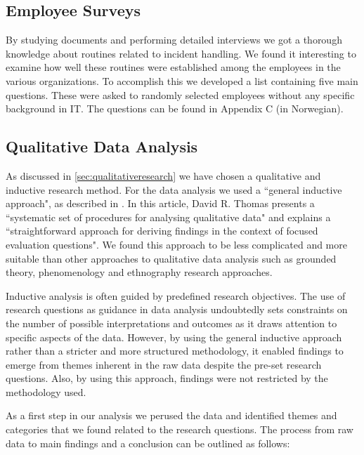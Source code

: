 \subsection{Employee Surveys}
\label{sec:employeeSurveys}
By studying documents and performing detailed interviews we got a thorough knowledge about routines related to incident handling. We found it interesting to examine how well these routines were established among the employees in the various organizations. To accomplish this we developed a list containing five main questions. These were asked to randomly selected employees without any specific background in IT. The questions can be found in Appendix C (in Norwegian).
 

\subsection{Qualitative Data Analysis}
\label{sec:qualitativeAnalysis}
As discussed in \ref{sec:qualitativeresearch} we have chosen a qualitative and inductive research method. For the data analysis we used a ``general inductive approach", as described in \cite{thomas2006general}. In this article, David R. Thomas presents a ``systematic set of procedures for analysing qualitative data" and explains a ``straightforward approach for deriving findings in the context of focused evaluation questions". We found this approach to be less complicated and more suitable than other approaches to qualitative data analysis such as grounded theory, phenomenology and ethnography research approaches\cite{thorne2000data}.

Inductive analysis is often guided by predefined research objectives. The use of research questions as guidance in data analysis undoubtedly sets constraints on the number of possible interpretations and outcomes as it draws attention to specific aspects of the data. However, by using the general inductive approach rather than a stricter and more structured methodology, it enabled findings to emerge from themes inherent in the raw data despite the pre-set research questions. Also, by using this approach, findings were not restricted by the methodology used. 

As a first step in our analysis we perused the data and identified themes and categories that we found related to the research questions. The process from raw data to main findings and a conclusion can be outlined as follows:


